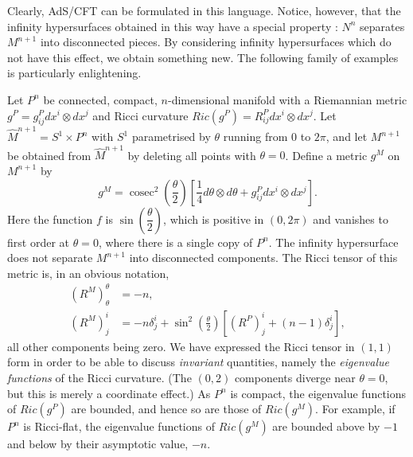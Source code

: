 \documentclass[a4paper,12pt]{article}
\theoremstyle{definition}
\renewcommand{\u}{\textit}
\renewcommand{\-}{$\dfrac{\quad\enspace}{\quad}$}
\DeclareMathOperator{\cosec}{cosec}
\begin{document}
Clearly, AdS/CFT can be formulated in this language. Notice, however, that the infinity hypersurfaces obtained in this way have a special property : $N^n$ separates $M^{n+1}$ into disconnected pieces. By considering infinity hypersurfaces which do not have this effect, we obtain something new. The following family of examples is particularly enlightening.

Let $P^n$ be connected, compact, $n$-dimensional manifold with a Riemannian metric $g^P=g^P_{ij}dx^i\otimes dx^j$ and Ricci curvature $Ric(g^P)=R^P_{ij}dx^i\otimes dx^j$. Let $\hat{M}^{n+1}=S^1\times P^n$ with $S^1$ parametrised by $\theta$ running from $0$ to $2\pi$, and let $M^{n+1}$ be obtained from $\hat{M}^{n+1}$ by deleting all points with $\theta=0$. Define a metric $g^M$ on $M^{n+1}$ by
\begin{equation}
g^M=\cosec^2(\frac{\theta}{2})[\frac{1}{4}d\theta\otimes d\theta + g^P_{ij}dx^i\otimes dx^j].
\end{equation}
Here the function $f$ is $\sin(\dfrac{\theta}{2})$, which is positive in $(0,2\pi)$ and vanishes to first order at $\theta=0$, where there is a single copy of $P^n$. The infinity hypersurface does not separate $M^{n+1}$ into disconnected components. The Ricci tensor of this metric is, in an obvious notation,
\begin{align}
(R^M)^\theta_\theta&=-n,\\
(R^M)^i_j&=-n\delta^i_j+\sin^2(\frac{\theta}{2})[(R^P)^i_j+(n-1)\delta^i_j],
\end{align}
all other components being zero. We have expressed the Ricci tensor in $(1,1)$ form in order to be able to discuss \u{invariant} quantities, namely the \u{eigenvalue functions} of the Ricci curvature. (The $(0,2)$ components diverge near $\theta=0$, but this is merely a coordinate effect.) As $P^n$ is compact, the eigenvalue functions of $Ric(g^P)$ are bounded, and hence so are those of $Ric(g^M)$. For example, if $P^n$ is Ricci-flat, the eigenvalue functions of $Ric(g^M)$ are bounded above by $-1$ and below by their asymptotic value, $-n$.
\end{document}
